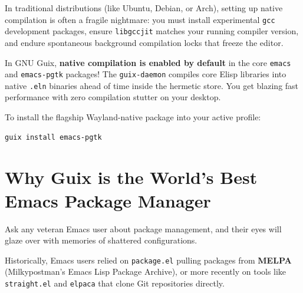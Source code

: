 \begin{protipbox}
In traditional distributions (like Ubuntu, Debian, or Arch), setting up native compilation is often a fragile nightmare: you must install experimental \texttt{gcc} development packages, ensure \texttt{libgccjit} matches your running compiler version, and endure spontaneous background compilation locks that freeze the editor.

In GNU Guix, \textbf{native compilation is enabled by default} in the core \texttt{emacs} and \texttt{emacs-pgtk} packages! The \texttt{guix-daemon} compiles core Elisp libraries into native \texttt{.eln} binaries ahead of time inside the hermetic store. You get blazing fast performance with zero compilation stutter on your desktop.
\end{protipbox}

To install the flagship Wayland-native package into your active profile:
\begin{lstlisting}[style=guixcli]
guix install emacs-pgtk
\end{lstlisting}

\section{Why Guix is the World's Best Emacs Package Manager}

Ask any veteran Emacs user about package management, and their eyes will glaze over with memories of shattered configurations.

Historically, Emacs users relied on \texttt{package.el} pulling packages from \textbf{MELPA} (Milkypostman's Emacs Lisp Package Archive), or more recently on tools like \texttt{straight.el} and \texttt{elpaca} that clone Git repositories directly.

